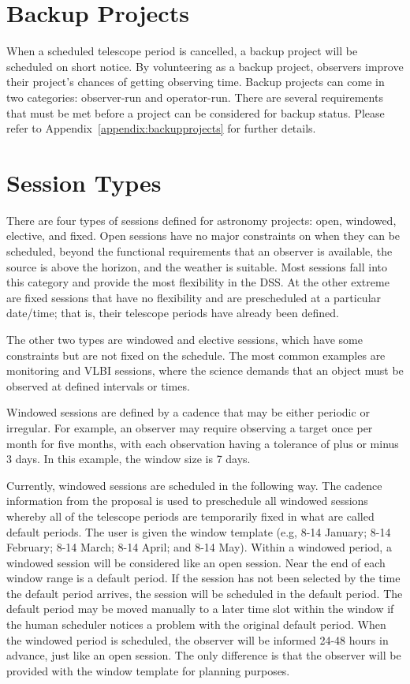 \section{Backup Projects}

When a scheduled telescope period is cancelled, a backup project will be scheduled on short notice.
By volunteering as a backup project, observers improve their project's chances of getting
observing time.  Backup projects can come in two categories: observer-run and operator-run.
There are several requirements that must be met before a project can be considered for backup
status. Please refer to Appendix~\ref{appendix:backupprojects} for further details.


\section{Session Types}


There are four types of sessions defined for astronomy projects: open, windowed, elective, and
fixed. Open sessions have no major constraints on when they can be scheduled, beyond
the functional requirements that an observer is available, the source is above the horizon,
and the weather is suitable. Most sessions fall into this category and provide the most
flexibility in the \gls{DSS}. At the other extreme are fixed sessions that have no flexibility
and are prescheduled at a particular date/time; that is, their telescope periods have already
been defined.

The other two types are windowed and elective sessions, which have some constraints but are
not fixed on the schedule. The most common examples are monitoring and \gls{VLBI} sessions,
where the science demands that an object must be observed at defined intervals or times.

Windowed sessions are defined by a cadence that may be either periodic or irregular. For
example, an observer may require observing a target once per month for five months, with
each observation having a tolerance of plus or minus 3 days. In this example, the window
size is 7 days.

Currently, windowed sessions are scheduled in the following way. The cadence information
from the proposal is used to preschedule all windowed sessions whereby all of the
telescope periods are temporarily fixed in what are called default periods. The user is
given the window template (e.g, 8-14 January; 8-14 February; 8-14 March; 8-14 April;
and 8-14 May). Within a windowed period, a windowed session will be considered like
an open session. Near the end of each window range is a default period. If the session
has not been selected by the time the default period arrives, the session will be scheduled
in the default period. The default period may be moved manually to a later time slot
within the window if the human scheduler notices a problem with the original default
period. When the windowed period is scheduled, the observer will be informed 24-48
hours in advance, just like an open session. The only difference is that the observer will
be provided with the window template for planning purposes.

